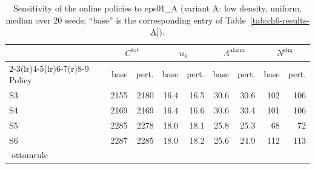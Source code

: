 \begin{table}[htbp]
\centering
\caption{Sensitivity of the online policies to eps01_A (variant A: low density, uniform,
median over 20 seeds; ``base'' is the corresponding entry of
Table~\ref{tab:ch6-results-A}).}
\label{tab:ch6-sens-A-eps01}
\footnotesize
\begin{tabular}{@{}l rr rr rr rr@{}}
\toprule
& \multicolumn{2}{c}{$C^{\mathrm{tot}}$} & \multicolumn{2}{c}{$n_b$}
  & \multicolumn{2}{c}{$A^{\mathrm{alarm}}$} & \multicolumn{2}{c}{$N^{\mathrm{chg}}$} \\
\cmidrule(r){2-3}\cmidrule(lr){4-5}\cmidrule(lr){6-7}\cmidrule(r){8-9}
Policy & base & pert. & base & pert. & base & pert. & base & pert. \\
\midrule

S3 & 2155 & 2180 & 16.4 & 16.5 & 30.6 & 30.6 & 102 & 106 \\
S4 & 2169 & 2169 & 16.4 & 16.6 & 30.6 & 30.4 & 101 & 106 \\
S5 & 2285 & 2278 & 18.0 & 18.1 & 25.8 & 25.3 & 68 & 72 \\
S6 & 2287 & 2285 & 18.0 & 18.2 & 25.6 & 24.9 & 112 & 113 \\
ottomrule
\end{tabular}
\end{table}
